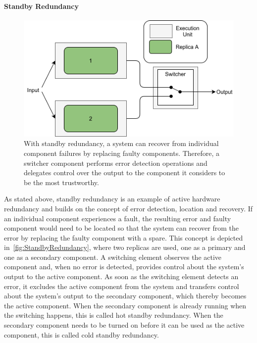 \paragraph{Standby Redundancy}
\begin{figure}[!hb]
	\centering
	\includegraphics[width=0.8\linewidth]{images/ActiveSelectionRedundancy}
	\caption{With standby redundancy, a system can recover from individual component failures by replacing faulty components. Therefore, a switcher component performs error detection operations and delegates control over the output to the component it considers to be the most trustworthy.}
	\label{fig:StandbyRedundancy}
\end{figure}

As stated above, standby redundancy is an example of active hardware redundancy and builds on the concept of error detection, location and recovery.
If an individual component experiences a fault, the resulting error and faulty component would need to be located so that the system can recover from the error by replacing the faulty component with a spare.
This concept is depicted in~\autoref{fig:StandbyRedundancy}, where two replicas are used, one as a primary and one as a secondary component.
A switching element observes the active component and, when no error is detected, provides control about the system's output to the active component.
As soon as the switching element detects an error, it excludes the active component from the system and transfers control about the system's output to the secondary component, which thereby becomes the active component.
When the secondary component is already running when the switching happens, this is called hot standby redundancy.
When the secondary component needs to be turned on before it can be used as the active component, this is called cold standby redundancy.

